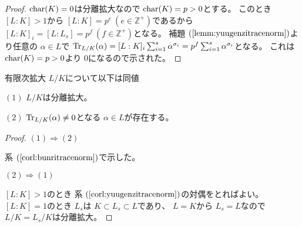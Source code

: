 \documentclass[../master_galois_theory]{subfiles}
\begin{document}
\begin{proof}
  $\mathrm{char}(K) = 0$は分離拡大なので $\mathrm{char}(K) = p > 0$とする。
  このとき $[L:K] > 1$から $[L:K] = p^e \  (e \in \mathbb{Z}^+)$であるから
  $[L:K]_i = [L:L_s] = p^f \  (f \in \mathbb{Z}^+)$となる。
  補題 $(\mathrm{\ref{lemm:yuugenzitracenorm}})$より任意の $\alpha \in L$で
  $\mathrm{Tr}_{L/K}(\alpha) = [L:K]_i \sum_{i=1}^s \alpha^{\sigma_i} = p^f \sum_{i=1}^s \alpha^{\sigma_i}$となる。
  これは $\mathrm{char}(K) = p > 0$より $0$になるので示された。
\end{proof}

\begin{prop}
  有限次拡大 $L/K$について以下は同値

  $(1)$
  $L/K$は分離拡大。

  $(2)$
  $\mathrm{Tr}_{L/K}(\alpha) \neq 0$となる $\alpha \in L$が存在する。
\end{prop}

\begin{proof}
  $(1) \Rightarrow (2)$

  系 $(\mathrm{\ref{corl:bunritracenorm}})$で示した。

  $(2) \Rightarrow (1)$

  $[L:K] > 1$のとき
  系 $(\mathrm{\ref{corl:yuugenzitracenorm}})$の対偶をとればよい。
  $[L:K] = 1$のとき $L_s$は $K \subset L_s \subset L$であり、
  $L = K$から $L_s = L$なので $L/K = L_s/K$は分離拡大。
\end{proof}

\clearpage
\end{document}
